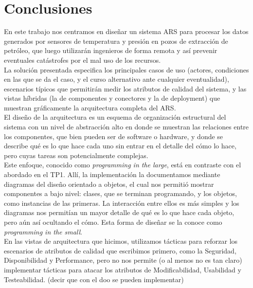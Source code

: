 \section{Conclusiones}

En este trabajo nos centramos en diseñar un sistema ARS para procesar los datos generados por sensores de temperatura y presión en pozos de extracción de petróleo, que luego utilizarán ingenieros de forma remota y así prevenir eventuales catástrofes por el mal uso de los recursos. \\

La solución presentada especifica los principales casos de uso (actores, condiciones en las que se da el caso, y el curso alternativo ante cualquier eventualidad), escenarios típicos que permitirán medir los atributos de calidad del sistema, y las vistas híbridas (la de componentes y conectores y la de deployment) que muestran gráficamente la arquitectura completa del ARS. \\

El diseño de la arquitectura es un esquema de organización estructural del sistema con un nivel de abstracción alto en donde se muestran las relaciones entre los componentes, que bien pueden ser de software o hardware, y donde se describe qué es lo que hace cada uno sin entrar en el detalle del cómo lo hace, pero cuyas tareas son potencialmente complejas. \\

Este enfoque, conocido como \textit{programming in the large}, está en contraste con el abordado en el TP1. Allí, la implementación la documentamos mediante diagramas del diseño orientado a objetos, el cual nos permitió mostrar componentes a bajo nivel: clases, que se terminan programando, y los objetos, como instancias de las primeras. La interacción entre ellos es más simples y los diagramas nos permitían un mayor detalle de qué es lo que hace cada objeto, pero aún así ocultando el cómo. Esta forma de diseñar se la conoce como \textit{programming in the small}. \\

En las vistas de arquitectura que hicimos, utilizamos tácticas para reforzar los escenarios de atributos de calidad que escribimos primero, como la Seguridad, Disponibilidad y Performance, pero no nos permite (o al menos no es tan claro) implementar tácticas para atacar los atributos de Modificabilidad, Usabilidad y Testeabilidad. (decir que con el doo se pueden implementar)
